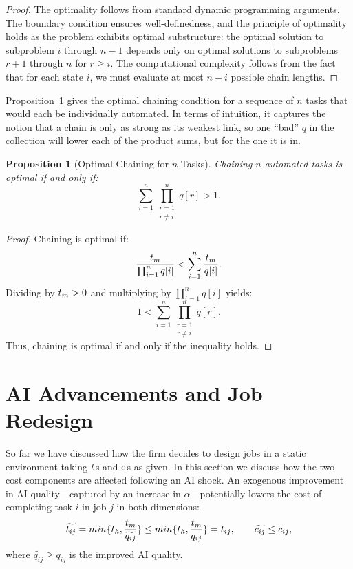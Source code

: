 \documentclass{article}
\theoremstyle{plain}
\theoremstyle{plain}
\newtheorem{proposition}[theorem]{Proposition}
\begin{document}
\begin{proof}
The optimality follows from standard dynamic programming arguments. The boundary condition ensures well-definedness, and the principle of optimality holds as the problem exhibits optimal substructure: the optimal solution to subproblem \(i\) through \(n-1\) depends only on optimal solutions to subproblems \(r+1\) through \(n\) for \(r \geq i\). The computational complexity follows from the fact that for each state \(i\), we must evaluate at most \(n-i\) possible chain lengths.
\end{proof}

Proposition~\ref{prop:optimal_chaining} gives the optimal chaining condition for a sequence of \(n\) tasks that would each be individually automated.
In terms of intuition, it captures the notion that a chain is only as strong as its weakest link, so one “bad” \(q\) in the collection will lower each of the product sums, but for the one it is in. 

\begin{proposition}[Optimal Chaining for \(n\) Tasks] \label{prop:optimal_chaining}
Chaining \(n\) automated tasks is optimal if and only if:
\[
\sum_{i=1}^n \prod_{\substack{r=1 \\ r \neq i}}^n q[r] > 1.
\]
\end{proposition}

\begin{proof}
Chaining is optimal if:
\[
\frac{t_{m}}{\prod_{i=1}^n q[i]} < \sum_{i=1}^n \frac{t_{m}}{q[i]}.
\]
Dividing by \(t_{m} > 0\) and multiplying by \(\prod_{i=1}^n q[i]\) yields:
\[
1 < \sum_{i=1}^n \prod_{\substack{r=1 \\ r \neq i}}^n q[r].
\]
Thus, chaining is optimal if and only if the inequality holds.
\end{proof}




\section{AI Advancements and Job Redesign}
\label{sec:job_redesign}

So far we have discussed how the firm decides to design jobs in a static environment taking $t_{}$s and $c_{}$s as given.
In this section we discuss how the two cost components are affected following an AI shock.
An exogenous improvement in AI quality---captured by an increase in $\alpha$---potentially lowers the cost of completing task $i$ in job $j$ in both dimensions:
\[
\widetilde{t_{ij}} = min\{t_{h}{}, \frac{t_{m}{}}{\widetilde{q_{ij}}}\} \le min\{t_{h}{}, \frac{t_{m}{}}{q_{ij}}\} = t_{ij},
\qquad
\widetilde{c_{ij}} \le c_{ij},
\]
where $\widetilde{q_{ij}} \geq q_{ij}$ is the improved AI quality.
\end{document}
